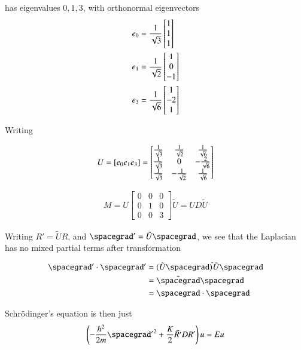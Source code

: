has eigenvalues $0,1,3$, with orthonormal eigenvectors
\begin{align}\label{eqn:desaiCh9:705}
e_0 &=
\frac{1}{\sqrt{3}}
\begin{bmatrix}
1 \\
1 \\
1
\end{bmatrix} \\
e_1 &=
\frac{1}{\sqrt{2}}
\begin{bmatrix}
1 \\
0 \\
-1
\end{bmatrix} \\
e_3 &=
\frac{1}{\sqrt{6}}
\begin{bmatrix}
1 \\
-2 \\
1
\end{bmatrix}
\end{align}

Writing

\begin{align}\label{eqn:desaiCh9:706}
U = [e_0 e_1 e_3]
=
\begin{bmatrix}
\frac{1}{\sqrt{3}} & \frac{1}{\sqrt{2}}  & \frac{1}{\sqrt{6}}  \\
\frac{1}{\sqrt{3}} & 0  & -\frac{2}{\sqrt{6}}  \\
\frac{1}{\sqrt{3}} & -\frac{1}{\sqrt{2}}  & \frac{1}{\sqrt{6}}
\end{bmatrix}
\end{align}

\begin{align}\label{eqn:desaiCh9:707}
M = U
\begin{bmatrix}
0 & 0 & 0 \\
0 & 1 & 0 \\
0 & 0 & 3
\end{bmatrix}
\tilde{U}
=
U D \tilde{U}
\end{align}

Writing $R' = \tilde{U} R$, and $\spacegrad' = \tilde{U} \spacegrad$, we see that the Laplacian has no mixed partial terms after transformation

\begin{align*}
\spacegrad' \cdot \spacegrad' 
&= 
(\tilde{U} \spacegrad)^{\tilde{}} \tilde{U} \spacegrad \\
&= 
\tilde{\spacegrad } \spacegrad \\
&= 
\spacegrad \cdot \spacegrad
\end{align*}

Schr\"{o}dinger's equation is then just
\begin{align}\label{eqn:desaiCh9:708}
\left( -\frac{\hbar^2}{2m} {\spacegrad'}^2 + \frac{K}{2} \tilde{R'} D R' \right) u = E u
\end{align}

